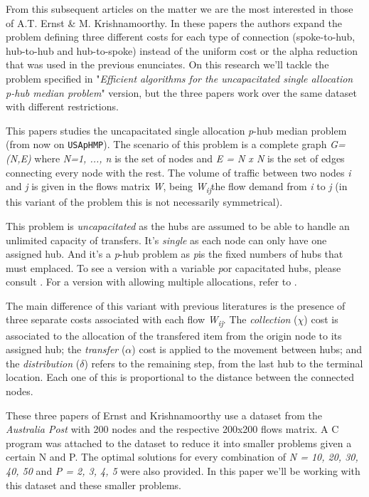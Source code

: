 \documentclass[onecolumn]{IEEEtran}
\newcommand{\ip}{\emph{p}}
\newcommand{\wij}{\emph{W\textsubscript{ij}}}
\def\code#1{\texttt{#1}}
\begin{document}
From this subsequent articles on the matter we are the most interested in those of A.T. Ernst \&
M. Krishnamoorthy\cite{Ernst1996}\cite{Ernst1998}\cite{Ernst1999}. In these papers the authors expand
the problem defining three different costs for each type of connection (spoke-to-hub, hub-to-hub and
hub-to-spoke) instead of the uniform cost or the alpha reduction that was used in the previous
enunciates. On this research we'll tackle the problem specified in "\emph{Efficient algorithms for
the uncapacitated single allocation \ip-hub median problem}"\cite{Ernst1996} version, but the three
papers work over the same dataset with different restrictions.

This papers studies the uncapacitated single allocation \ip-hub median problem (from now on
\code{USApHMP}). The scenario of this problem is a complete graph \emph{G=(N,E)} where \emph{N={1, ..., n}} is
the set of nodes and \emph{E = N x N} is the set of edges connecting every node with the rest.
The volume of traffic between two nodes \emph{i} and \emph{j} is given in the flows matrix \emph{W}, 
being \wij the flow demand from \emph{i} to \emph{j} (in this variant of the problem this
is not necessarily symmetrical).

This problem is \emph{uncapacitated} as the hubs are assumed to be able to handle an unlimited
capacity of transfers. It's \emph{single} as each node can only have one assigned hub. And
it's a \ip-hub problem as \ip is the fixed numbers of hubs that must emplaced. To see a version
with a variable \ip or capacitated hubs, please consult \cite{Ernst1999}. For a version with 
allowing multiple allocations, refer to \cite{Ernst1998}.

The main difference of this variant with previous literatures is the presence of three separate
costs associated with each flow \wij. The \emph{collection} ($\chi$) cost is associated to the allocation 
of the transfered item from the origin node to its assigned hub; the \emph{transfer} ($\alpha$) cost is 
applied to the movement between hubs; and the \emph{distribution} ($\delta$) refers to the remaining step, 
from the last hub to the terminal location. Each one of this is proportional to the distance between 
the connected nodes.

These three papers of Ernst and Krishnamoorthy use a dataset from the \emph{Australia Post} with 200
nodes and the respective 200x200 flows matrix. A C program was attached to the dataset to reduce
it into smaller problems given a certain N and P. The optimal solutions for every combination of 
\emph{N = {10, 20, 30, 40, 50}} and \emph{P = {2, 3, 4, 5}} were also provided. In this paper we'll
be working with this dataset and these smaller problems.
\end{document}
